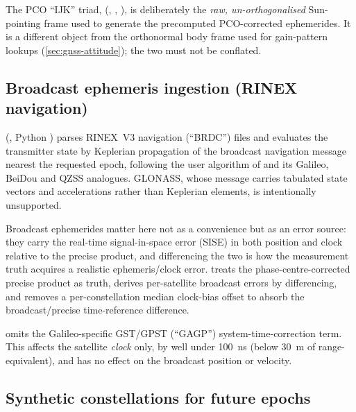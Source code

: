 \begin{lupntnote}
  The PCO ``IJK'' triad, 
  (, ,
  ), is deliberately the \emph{raw, un-orthogonalised}
  Sun-pointing frame used to generate the precomputed PCO-corrected
  ephemerides. It is a different object from the orthonormal
   body frame used for gain-pattern lookups
  (\cref{sec:gnss-attitude}); the two must not be conflated.
\end{lupntnote}

\subsection{Broadcast ephemeris ingestion (RINEX navigation)}
\label{sec:gnss-brdc}

 (, Python
) parses RINEX~V3 navigation (``BRDC'') files and
evaluates the transmitter state by Keplerian propagation of the broadcast
navigation message nearest the requested epoch, following the user algorithm
of \citet{icdgps200} and its Galileo, BeiDou and QZSS analogues. GLONASS,
whose message carries tabulated state vectors and accelerations rather than
Keplerian elements, is intentionally unsupported.

Broadcast ephemerides matter here not as a convenience but as an error source:
they carry the real-time signal-in-space error (SISE) in both position and
clock relative to the precise product, and differencing the two is how the
measurement truth acquires a realistic ephemeris/clock error.
\citet[Ch.~6.4.2 and 6.5.2]{iiyama2026thesis} treats the
phase-centre-corrected precise product as truth, derives per-satellite
broadcast errors by differencing, and removes a per-constellation median
clock-bias offset to absorb the broadcast/precise time-reference difference.

\begin{lupntnote}
   omits the Galileo-specific GST/GPST (``GAGP'')
  system-time-correction term. This affects the satellite \emph{clock} only,
  by well under \SI{100}{\nano\second} (below \SI{30}{\meter} of
  range-equivalent), and has no effect on the broadcast position or velocity.
\end{lupntnote}

\subsection{Synthetic constellations for future epochs}
\label{sec:gnss-almanac}

